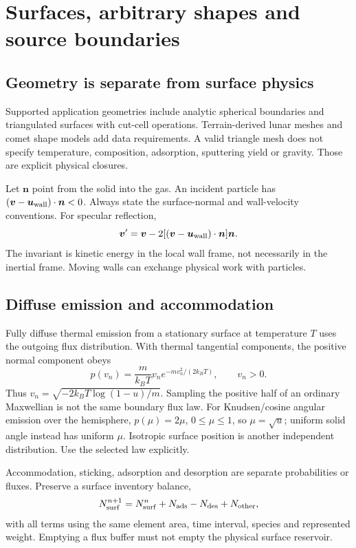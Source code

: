 \chapter{Surfaces, arbitrary shapes and source boundaries}\label{ch:surfaces}
\section{Geometry is separate from surface physics}
Supported application geometries include analytic spherical boundaries and
triangulated surfaces with cut-cell operations. Terrain-derived lunar meshes
and comet shape models add data requirements. A valid triangle mesh does not
specify temperature, composition, adsorption, sputtering yield or gravity.
Those are explicit physical closures.

Let $\boldsymbol n$ point from the solid into the gas. An incident particle
has $(\boldsymbol v-\boldsymbol u_{\rm wall})\cdot\boldsymbol n<0$.
Always state the surface-normal and wall-velocity conventions. For specular
reflection,
\begin{equation}
\boldsymbol v'=\boldsymbol v-
2[(\boldsymbol v-\boldsymbol u_{\rm wall})\cdot\boldsymbol n]\boldsymbol n .
\end{equation}
The invariant is kinetic energy in the local wall frame, not necessarily in
the inertial frame. Moving walls can exchange physical work with particles.

\section{Diffuse emission and accommodation}
Fully diffuse thermal emission from a stationary surface at temperature $T$
uses the outgoing flux distribution. With thermal tangential components,
the positive normal component obeys
\begin{equation}
p(v_n)=\frac{m}{k_BT}v_n e^{-mv_n^2/(2k_BT)},\qquad v_n>0.
\end{equation}
Thus $v_n=\sqrt{-2k_BT\log(1-u)/m}$. Sampling the positive half of an ordinary
Maxwellian is not the same boundary flux law.
For Knudsen/cosine angular emission over the hemisphere,
$p(\mu)=2\mu$, $0\leq\mu\leq1$, so $\mu=\sqrt u$; uniform solid angle
instead has uniform $\mu$. Isotropic surface position is another independent
distribution. Use the selected law explicitly.

Accommodation, sticking, adsorption and desorption are separate probabilities
or fluxes. Preserve a surface inventory balance,
\begin{equation}
N_{\rm surf}^{n+1}=N_{\rm surf}^{n}
+N_{\rm ads}-N_{\rm des}+N_{\rm other},
\end{equation}
with all terms using the same element area, time interval, species and
represented weight. Emptying a flux buffer must not empty the physical
surface reservoir.

